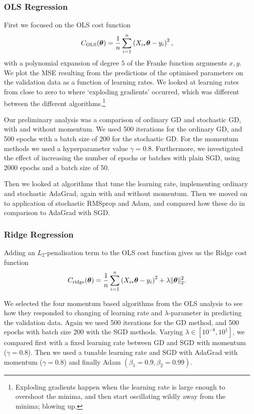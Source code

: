     \subsubsection{OLS Regression}
        First we focused on the OLS cost function
        \begin{align}
            \msub{C}{OLS}(\vec{\theta}) = \frac{1}{n}\sum_{i=1}^n \pclosed{X_{i*}\vec{\theta} - y_i}^2,
        \end{align}
        with a polynomial expansion of degree $5$ of the Franke function arguments $x,y$. We plot the MSE resulting from the predictions of the optimised parameters on the validation data as a function of learning rates. We looked at learning rates from close to zero to where `exploding gradients' occurred, which was different between the different algorithms.\footnote{Exploding gradients happen when the learning rate is large enough to overshoot the minima, and then start oscillating wildly away from the minima; blowing up.}

        Our preliminary analysis was a comparison of ordinary GD and stochastic GD, with and without momentum. We used 500 iterations for the ordinary GD, and 500 epochs with a batch size of 200 for the stochastic GD. For the momentum methods we used a hyperparameter value $\gamma=0.8$. Furthermore, we investigated the effect of increasing the number of epochs or batches with plain SGD, using 2000 epochs and a batch size of 50.

        Then we looked at algorithms that tune the learning rate, implementing ordinary and stochastic AdaGrad, again with and without momentum. Then we moved on to application of stochastic RMSprop and Adam, and compared how these do in comparison to AdaGrad with SGD.


    \subsubsection{Ridge Regression}
        Adding an $L_2$-penalisation term to the OLS cost function gives us the Ridge cost function
        \begin{align}
            \msub{C}{ridge}(\vec{\theta}) = \frac{1}{n}\sum_{i=1}^n \pclosed{X_{i*}\vec{\theta} - y_i}^2 + \lambda\norm[2]{\vec{\theta}}^2.
        \end{align}

        We selected the four momentum based algorithms from the OLS analysis to see how they responded to changing of learning rate and $\lambda$-parameter in predicting the validation data. Again we used 500 iterations for the GD method, and 500 epochs with batch size 200 with the SGD methods. Varying $\lambda \in [10^{-8}, 10^1]$, we compared first with a fixed learning rate between GD and SGD with momentum ($\gamma=0.8$). Then we used a tunable learning rate and SGD with AdaGrad with momentum ($\gamma=0.8$) and finally Adam $(\beta_1=0.9, \beta_2=0.99)$.

